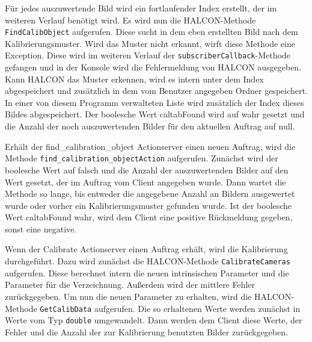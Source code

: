 Für jedes auszuwertende Bild wird ein fortlaufender Index erstellt, der im weiteren Verlauf benötigt wird. Es wird nun die HALCON-Methode \texttt{FindCalibObject} aufgerufen. Diese sucht in dem eben erstellten Bild nach dem Kalibrierungsmuster. Wird das Muster nicht erkannt, wirft diese Methode eine Exception. Diese wird im weiteren Verlauf der \texttt{subscriberCallback}-Methode gefangen und in der Konsole wird die Fehlermeldung von HALCON ausgegeben. Kann HALCON das Muster erkennen, wird es intern unter dem Index abgespeichert und zusätzlich in dem vom Benutzer angegeben Ordner gespeichert. In einer von diesem Programm verwalteten Liste wird zusätzlich der Index dieses Bildes abgespeichert. Der boolesche Wert caltabFound wird auf wahr gesetzt und die Anzahl der noch auszuwertenden Bilder für den aktuellen Auftrag auf null. 

Erhält der find\_calibration\_object Actionserver einen neuen Auftrag, wird die Methode \texttt{find\_calibration\_objectAction} aufgerufen. Zunächst wird der boolesche Wert auf falsch und die Anzahl der auszuwertenden Bilder auf den Wert gesetzt, der im Auftrag vom Client angegeben wurde. Dann wartet die Methode so lange, bis entweder die angegebene Anzahl an Bildern ausgewertet wurde oder vorher ein Kalibrierungsmuster gefunden wurde. Ist der boolesche Wert caltabFound wahr, wird dem Client eine positive Rückmeldung gegeben, sonst eine negative.

Wenn der Calibrate Actionserver einen Auftrag erhält, wird die Kalibrierung durchgeführt. Dazu wird zunächst die HALCON-Methode \texttt{CalibrateCameras} aufgerufen. Diese berechnet intern die neuen intrinsischen Parameter und die Parameter für die Verzeichnung. Außerdem wird der mittlere Fehler zurückgegeben. Um nun die neuen Parameter zu erhalten, wird die HALCON-Methode \texttt{GetCalibData} aufgerufen. Die so erhaltenen Werte werden zunächst in Werte vom Typ \texttt{double} umgewandelt. Dann werden dem Client diese Werte, der Fehler und die Anzahl der zur Kalibrierung benutzten Bilder zurückgegeben.

